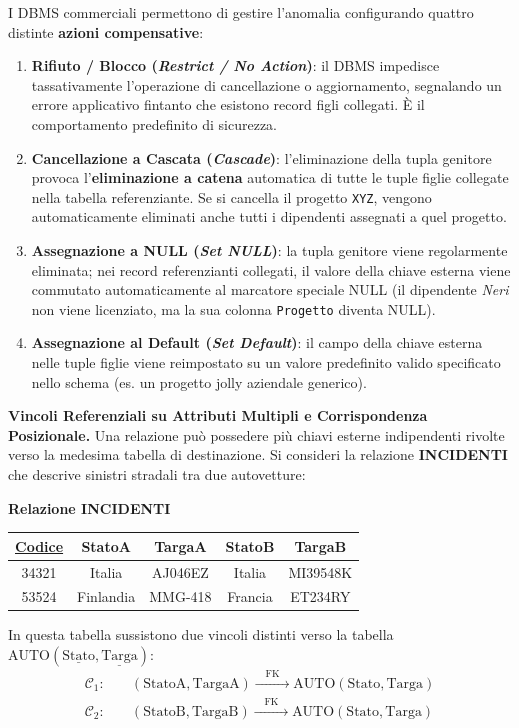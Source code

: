 \documentclass[12pt]{extarticle}
\begin{document}
\medskip
\noindent I DBMS commerciali permettono di gestire l'anomalia configurando quattro distinte \textbf{azioni compensative}:
\begin{enumerate}
    \item \textbf{Rifiuto / Blocco (\textit{Restrict / No Action})}: il DBMS impedisce tassativamente l'operazione di cancellazione o aggiornamento, segnalando un errore applicativo fintanto che esistono record figli collegati. È il comportamento predefinito di sicurezza.
    \item \textbf{Cancellazione a Cascata (\textit{Cascade})}: l'eliminazione della tupla genitore provoca l'\textbf{eliminazione a catena} automatica di tutte le tuple figlie collegate nella tabella referenziante. Se si cancella il progetto \texttt{XYZ}, vengono automaticamente eliminati anche tutti i dipendenti assegnati a quel progetto.
    \item \textbf{Assegnazione a NULL (\textit{Set NULL})}: la tupla genitore viene regolarmente eliminata; nei record referenzianti collegati, il valore della chiave esterna viene commutato automaticamente al marcatore speciale NULL (il dipendente \textit{Neri} non viene licenziato, ma la sua colonna \texttt{Progetto} diventa NULL).
    \item \textbf{Assegnazione al Default (\textit{Set Default})}: il campo della chiave esterna nelle tuple figlie viene reimpostato su un valore predefinito valido specificato nello schema (es. un progetto jolly aziendale generico).
\end{enumerate}

\medskip
\noindent \textbf{Vincoli Referenziali su Attributi Multipli e Corrispondenza Posizionale.} Una relazione può possedere più chiavi esterne indipendenti rivolte verso la medesima tabella di destinazione. Si consideri la relazione \textbf{INCIDENTI} che descrive sinistri stradali tra due autovetture:
\begin{center}
\small
\textbf{Relazione INCIDENTI} \\[1ex]
\begin{tabular}{ccccc}
    \toprule
    \textbf{\underline{Codice}} & \textbf{StatoA} & \textbf{TargaA} & \textbf{StatoB} & \textbf{TargaB} \\
    \midrule
    34321 & Italia & AJ046EZ & Italia & MI39548K \\
    53524 & Finlandia & MMG-418 & Francia & ET234RY \\
    \bottomrule
\end{tabular}
\end{center}
\medskip
\noindent In questa tabella sussistono due vincoli distinti verso la tabella $\text{AUTO}(\underline{\text{Stato}}, \underline{\text{Targa}})$:
\begin{align*}
\mathcal{C}_1: & \quad (\text{StatoA}, \text{TargaA}) \xrightarrow{\quad \text{FK} \quad} \text{AUTO}(\text{Stato}, \text{Targa}) \\
\mathcal{C}_2: & \quad (\text{StatoB}, \text{TargaB}) \xrightarrow{\quad \text{FK} \quad} \text{AUTO}(\text{Stato}, \text{Targa})
\end{align*}
\end{document}
